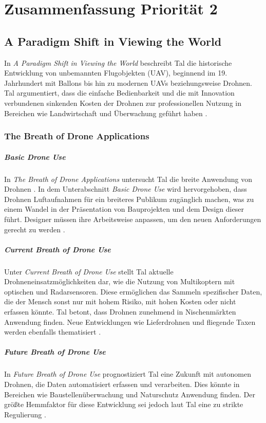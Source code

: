 \chapter{Zusammenfassung Priorität 2}\label{ch:summary1}

\section{A Paradigm Shift in Viewing the World}
In \textit{A Paradigm Shift in Viewing the World} beschreibt Tal die historische Entwicklung von unbemannten Flugobjekten (UAV), beginnend im 19. Jahrhundert mit Ballons bis hin zu modernen UAVs beziehungsweise Drohnen.
Tal argumentiert, dass die einfache Bedienbarkeit und die mit Innovation verbundenen sinkenden Kosten der Drohnen zur professionellen Nutzung in Bereichen wie Landwirtschaft und Überwachung geführt haben \cite[p. 11]{Tal2021}.

\subsection{The Breath of Drone Applications}
\paragraph{Basic Drone Use}
In \textit{The Breath of Drone Applications} untersucht Tal die breite Anwendung von Drohnen \cite[p. 12]{Tal2021}.
In dem Unterabschnitt \textit{Basic Drone Use} wird hervorgehoben, dass Drohnen Luftaufnahmen für ein breiteres Publikum zugänglich machen, was zu einem Wandel in der Präsentation von Bauprojekten und dem Design dieser führt.
Designer müssen ihre Arbeitsweise anpassen, um den neuen Anforderungen gerecht zu werden \cite[p. 12]{Tal2021}.

\paragraph{Current Breath of Drone Use}
Unter \textit{Current Breath of Drone Use} stellt Tal aktuelle Drohneneinsatzmöglichkeiten dar, wie die Nutzung von Multikoptern mit optischen und Radarsensoren.
Diese ermöglichen das Sammeln spezifischer Daten, die der Mensch sonst nur mit hohem Risiko, mit hohen Kosten oder nicht erfassen könnte.
Tal betont, dass Drohnen zunehmend in Nischenmärkten Anwendung finden.
Neue Entwicklungen wie Lieferdrohnen und fliegende Taxen werden ebenfalls thematisiert \cite[pp. 13-15]{Tal2021}.

\paragraph{Future Breath of Drone Use}
In \textit{Future Breath of Drone Use} prognostiziert Tal eine Zukunft mit autonomen Drohnen, die Daten automatisiert erfassen und verarbeiten.
Dies könnte in Bereichen wie Baustellenüberwachung und Naturschutz Anwendung finden.
Der größte Hemmfaktor für diese Entwicklung sei jedoch laut Tal eine zu strikte Regulierung \cite[p. 16]{Tal2021}.

